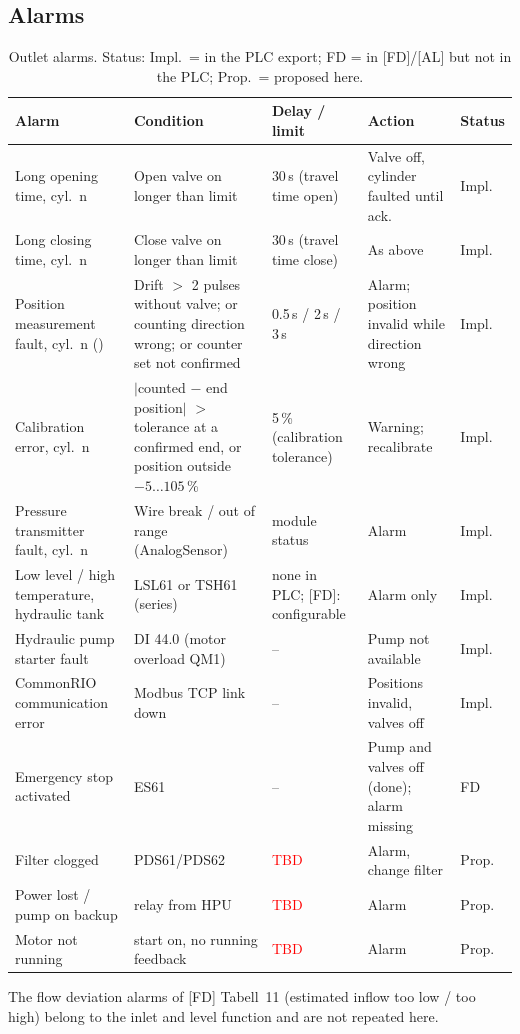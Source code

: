 \documentclass[11pt,a4paper]{article}
\newcommand{\TBD}{\textcolor{red}{TBD}}
\begin{document}
\subsection{Alarms}
\begin{table}[htbp]
\centering
\caption{Outlet alarms. Status: Impl.\ = in the PLC export; FD = in [FD]/[AL] but not in the PLC; Prop.\ = proposed here.}
\label{tab:alarms}
\begin{small}
\begin{tabularx}{\textwidth}{@{}P{34mm}LP{26mm}P{26mm}P{12mm}@{}}
\toprule
Alarm & Condition & Delay / limit & Action & Status \\
\midrule
Long opening time, cyl.\ n & Open valve on longer than limit & 30\,s (travel time open) & Valve off, cylinder faulted until ack. & Impl. \\
Long closing time, cyl.\ n & Close valve on longer than limit & 30\,s (travel time close) & As above & Impl. \\
Position measurement fault, cyl.\ n () & Drift $>$ 2 pulses without valve; or counting direction wrong; or counter set not confirmed & 0.5\,s / 2\,s / 3\,s & Alarm; position invalid while direction wrong & Impl. \\
Calibration error, cyl.\ n & $|$counted $-$ end position$|$ $>$ tolerance at a confirmed end, or position outside $-5\ldots105$\,\% & 5\,\% (calibration tolerance) & Warning; recalibrate & Impl. \\
Pressure transmitter fault, cyl.\ n & Wire break / out of range (AnalogSensor) & module status & Alarm & Impl. \\
Low level / high temperature, hydraulic tank & LSL61 or TSH61 (series) & none in PLC; [FD]: configurable & Alarm only  & Impl. \\
Hydraulic pump starter fault & DI 44.0 (motor overload QM1) & -- & Pump not available & Impl. \\
CommonRIO communication error & Modbus TCP link down & -- & Positions invalid, valves off & Impl. \\
Emergency stop activated & ES61 & -- & Pump and valves off (done); alarm missing & FD  \\
Filter clogged & PDS61/PDS62 & \TBD & Alarm, change filter & Prop.\  \\
Power lost / pump on backup & relay from HPU & \TBD & Alarm & Prop.\  \\
Motor not running & start on, no running feedback & \TBD & Alarm & Prop.\  \\
\bottomrule
\end{tabularx}
\end{small}
\end{table}
The flow deviation alarms of [FD] Tabell~11 (estimated inflow too low / too high) belong to the
inlet and level function and are not repeated here.
\end{document}
